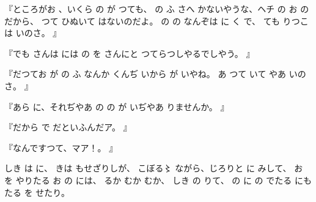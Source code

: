 『ところがお
、いくら
の
が
つても、
の
ふ
さへ
かないやうな、ヘチ
の
お
の
だから、
つて
ひぬいて
はないのだよ。
の
の
なんぞは
に
く
で、
ても
りつこは
いのさ。
』

『でも
さんは
には
の
を
さんにと
つてらつしやるでしやう。
』

『だつてお
が
の
ふ
なんか
くんぢ
いから
が
いやね。
あ
つて
いて
やあ
いのさ。
』

『あら
に、それぢやあ
の
の
が%
いぢやあ
りませんか。
』

『だから
で
だといふんだア。
』

『なんですつて、マア！。
』

しき
は
に、%
きは
もせざりしが、
こぼる〻%
ながら、じろりと
に%
みして、
お
を
やりたる
お
の
には、
るか
むか
むか、
しき
の
りて、
の
に
の
でたる
にも
たる
を
せたり。
